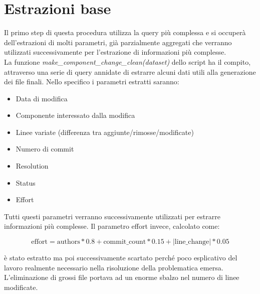 \documentclass[%
    corpo=12pt,
    twoside,
    oldstyle,
    autoretitolo,
    greek,
    evenboxes,
]{toptesi}
\begin{document}
\section{Estrazioni base}
Il primo step di questa procedura utilizza la query più complessa e si occuperà dell'estrazioni di molti parametri, già parzialmente aggregati che verranno utilizzati successivamente per l'estrazione di informazioni più complesse.\\
La funzione \textit{make\_component\_change\_clean(dataset)} dello script ha il compito, attraverso una serie di query annidate di estrarre alcuni dati utili alla generazione dei file finali. Nello specifico i parametri estratti saranno:
\begin{itemize}
  \item Data di modifica
  \item Componente interessato dalla modifica
  \item Linee variate (differenza tra aggiunte/rimosse/modificate)
  \item Numero di commit
  \item Resolution
  \item Status
  \item Effort
\end{itemize}
Tutti questi parametri verranno successivamente utilizzati per estrarre informazioni più complesse. Il parametro effort invece, calcolato come:
\begin{center}
  \begin{equation}
    \textrm{effort} = \textrm{authors} * 0.8 + \textrm{commit\_count} * 0.15 + |\textrm{line\_change}| * 0.05
  \end{equation}
\end{center}
è stato estratto ma poi successivamente scartato perché poco esplicativo del lavoro realmente necessario nella risoluzione della problematica emersa. L'eliminazione di grossi file portava ad un enorme sbalzo nel numero di linee modificate.\\
\end{document}
